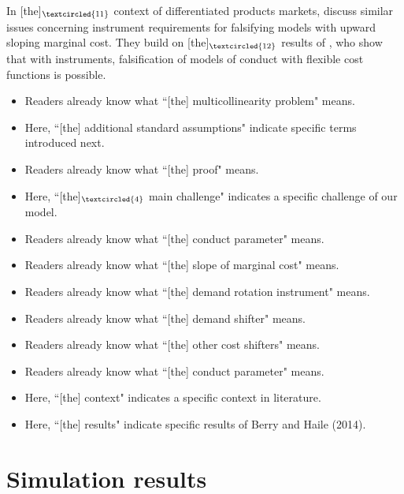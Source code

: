 \documentclass[11pt, a4paper]{article}
\begin{document}
In [the]$_{\textcircled{11}}$ context of differentiated products markets, \cite{magnolfi2022falsifying} discuss similar issues concerning instrument requirements for falsifying models with upward sloping marginal cost. 
They build on [the]$_{\textcircled{12}}$ results of \cite{berry2014identification}, who show that with instruments, falsification of models of conduct with flexible cost functions is possible.

\begin{itemize}
    
    \item[\textcircled{1}] Readers already know what ``[the] multicollinearity problem"  means.
    \item[\textcircled{2}] Here, ``[the] additional standard assumptions" indicate specific terms introduced next.
    \item[\textcircled{3}] Readers already know what ``[the] proof"  means.
    \item[\textcircled{4}] Here, ``[the]$_{\textcircled{4}}$ main challenge" indicates a specific challenge of our model.
    \item[\textcircled{5}] Readers already know what ``[the] conduct parameter"  means.
    \item[\textcircled{6}] Readers already know what ``[the] slope of marginal cost"  means.
    \item[\textcircled{7}] Readers already know what ``[the] demand rotation instrument"  means.
    \item[\textcircled{8}] Readers already know what ``[the] demand shifter"  means.
    \item[\textcircled{9}] Readers already know what ``[the] other cost shifters"  means.
    \item[\textcircled{10}] Readers already know what ``[the] conduct parameter"  means.
    \item[\textcircled{11}] Here, ``[the] context" indicates a specific context in literature. 
    \item[\textcircled{12}] Here, ``[the] results" indicate specific results of Berry and Haile (2014). 
\end{itemize}


\newpage
\section{Simulation results}\label{sec:results}
\end{document}
